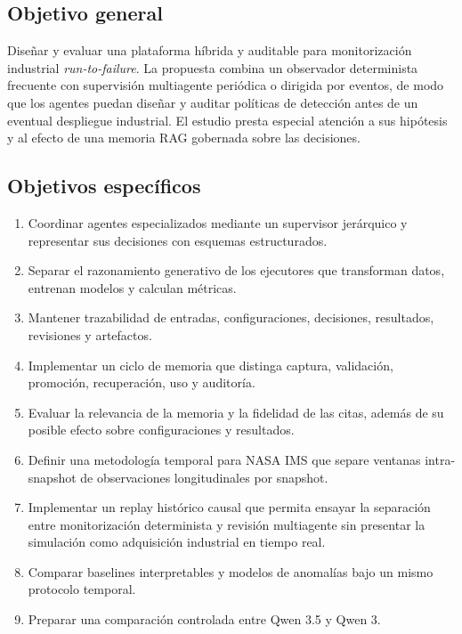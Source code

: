 \subsection{Objetivo general}

Diseñar y evaluar una plataforma híbrida y auditable para monitorización
industrial \textit{run-to-failure}. La propuesta combina un observador
determinista frecuente con supervisión multiagente periódica o dirigida por
eventos, de modo que los agentes puedan diseñar y auditar políticas de
detección antes de un eventual despliegue industrial. El estudio presta
especial atención a sus hipótesis y al efecto de una memoria RAG gobernada
sobre las decisiones.

\subsection{Objetivos específicos}

\begin{enumerate}
  \item Coordinar agentes especializados mediante un supervisor jerárquico y
        representar sus decisiones con esquemas estructurados.
  \item Separar el razonamiento generativo de los ejecutores que transforman
        datos, entrenan modelos y calculan métricas.
  \item Mantener trazabilidad de entradas, configuraciones, decisiones,
        resultados, revisiones y artefactos.
  \item Implementar un ciclo de memoria que distinga captura, validación,
        promoción, recuperación, uso y auditoría.
  \item Evaluar la relevancia de la memoria y la fidelidad de las citas, además
        de su posible efecto sobre configuraciones y resultados.
  \item Definir una metodología temporal para NASA IMS que separe ventanas
        intra-snapshot de observaciones longitudinales por snapshot.
  \item Implementar un replay histórico causal que permita ensayar la
        separación entre monitorización determinista y revisión multiagente
        sin presentar la simulación como adquisición industrial en tiempo real.
  \item Comparar baselines interpretables y modelos de anomalías bajo un mismo
        protocolo temporal.
  \item Preparar una comparación controlada entre Qwen 3.5 y Qwen 3.
\end{enumerate}

